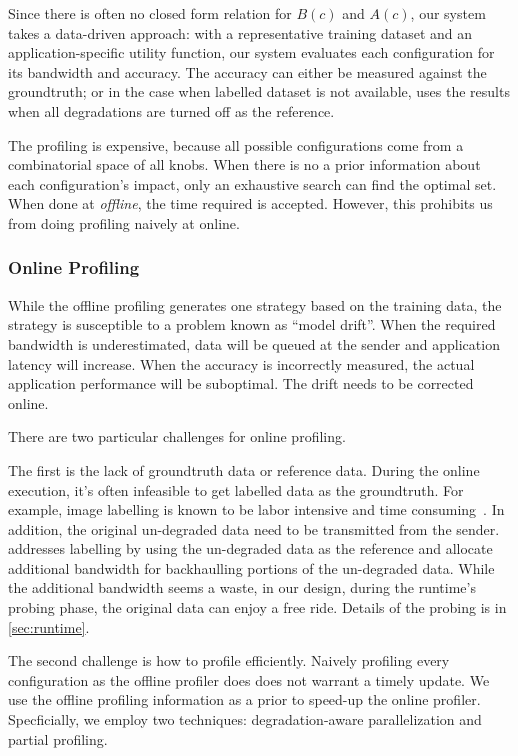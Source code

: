 Since there is often no closed form relation for $B(c)$ and $A(c)$, our system
takes a data-driven approach: with a representative training dataset and an
application-specific utility function, our system evaluates each configuration
for its bandwidth and accuracy. The accuracy can either be measured against the
groundtruth; or in the case when labelled dataset is not available, \sysname{}
uses the results when all degradations are turned off as the reference.

The profiling is expensive, because all possible configurations come from a
combinatorial space of all knobs. When there is no a prior information about
each configuration's impact, only an exhaustive search can find the optimal set.
When done at \textit{offline}, the time required is accepted. However, this
prohibits us from doing profiling naively at online.

\subsubsection{Online Profiling}
\label{sec:online-profiling}

While the offline profiling generates one strategy based on the training data,
the strategy is susceptible to a problem known as ``model drift''. When the
required bandwidth is underestimated, data will be queued at the sender and
application latency will increase. When the accuracy is incorrectly measured,
the actual application performance will be suboptimal. The drift needs to be
corrected online.

There are two particular challenges for online profiling.

The first is the lack of groundtruth data or reference data. During the online
execution, it's often infeasible to get labelled data as the groundtruth. For
example, image labelling is known to be labor intensive and time
consuming~\cite{russell2008labelme}. In addition, the original un-degraded data
need to be transmitted from the sender.  \sysname{} addresses labelling by using
the un-degraded data as the reference and allocate additional bandwidth for
backhaulling portions of the un-degraded data. While the additional bandwidth
seems a waste, in our design, during the runtime's probing phase, the original
data can enjoy a free ride. Details of the probing is in \autoref{sec:runtime}.

The second challenge is how to profile efficiently. Naively profiling every
configuration as the offline profiler does does not warrant a timely update. We
use the offline profiling information as a prior to speed-up the online
profiler. Specficially, we employ two techniques: degradation-aware
parallelization and partial profiling.

